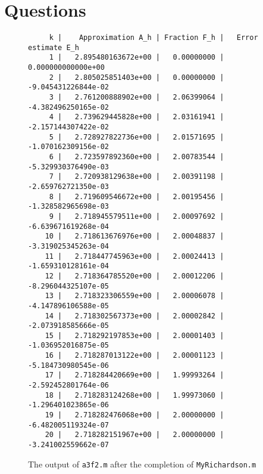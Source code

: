 \documentclass[a4paper,12pt]{article}
\begin{document}
\section{Questions}

\begin{figure}
\begin{verbatim}
     k |    Approximation A_h | Fraction F_h |   Error estimate E_h
     1 |   2.895480163672e+00 |   0.00000000 |   0.000000000000e+00
     2 |   2.805025851403e+00 |   0.00000000 |  -9.045431226844e-02
     3 |   2.761200888902e+00 |   2.06399064 |  -4.382496250165e-02
     4 |   2.739629445828e+00 |   2.03161941 |  -2.157144307422e-02
     5 |   2.728927822736e+00 |   2.01571695 |  -1.070162309156e-02
     6 |   2.723597892360e+00 |   2.00783544 |  -5.329930376490e-03
     7 |   2.720938129638e+00 |   2.00391198 |  -2.659762721350e-03
     8 |   2.719609546672e+00 |   2.00195456 |  -1.328582965698e-03
     9 |   2.718945579511e+00 |   2.00097692 |  -6.639671619268e-04
    10 |   2.718613676976e+00 |   2.00048837 |  -3.319025345263e-04
    11 |   2.718447745963e+00 |   2.00024413 |  -1.659310128161e-04
    12 |   2.718364785520e+00 |   2.00012206 |  -8.296044325107e-05
    13 |   2.718323306559e+00 |   2.00006078 |  -4.147896106588e-05
    14 |   2.718302567373e+00 |   2.00002842 |  -2.073918585666e-05
    15 |   2.718292197853e+00 |   2.00001403 |  -1.036952016875e-05
    16 |   2.718287013122e+00 |   2.00001123 |  -5.184730980545e-06
    17 |   2.718284420669e+00 |   1.99993264 |  -2.592452801764e-06
    18 |   2.718283124268e+00 |   1.99973060 |  -1.296401023865e-06
    19 |   2.718282476068e+00 |   2.00000000 |  -6.482005119324e-07
    20 |   2.718282151967e+00 |   2.00000000 |  -3.241002559662e-07
\end{verbatim} \caption{The output of {\tt a3f2.m} after the completion of {\tt MyRichardson.m}} \label{fig:a3f2}
\end{figure} 
\end{document}
